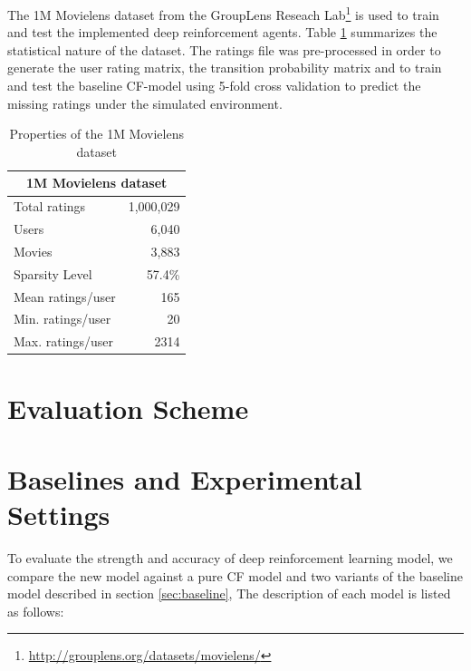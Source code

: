 The 1M Movielens dataset \cite{harper2016movielens} from the GroupLens Reseach Lab\footnote{\url{http://grouplens.org/datasets/movielens/}} is used to train and test the implemented deep reinforcement agents. Table \ref{table:dataset} summarizes the statistical nature of the dataset. The ratings file was pre-processed in order to generate the user rating matrix, the transition probability matrix and to train and test the baseline CF-model using 5-fold cross validation to predict the missing ratings under the simulated environment.

\begin{table}[!htbp]
\centering
\begin{tabular}{ |l|r| }
  \hline
  \multicolumn{2}{|c|}{1M Movielens dataset} \\
  \hline
  Total ratings & 1,000,029 \\
  Users & 6,040 \\
  Movies & 3,883 \\
  Sparsity Level & 57.4\% \\
  Mean ratings/user & 165 \\
  Min. ratings/user & 20 \\
  Max. ratings/user & 2314 \\
  \hline
\end{tabular}
\caption{Properties of the 1M Movielens dataset}
\label{table:dataset}
\end{table}

\section{Evaluation Scheme}

\section{Baselines and Experimental Settings}

To evaluate the strength and accuracy of deep reinforcement learning model, we compare the new model against a pure CF model and two variants of the baseline model described in section \ref{sec:baseline}, The description of each model is listed as follows:

